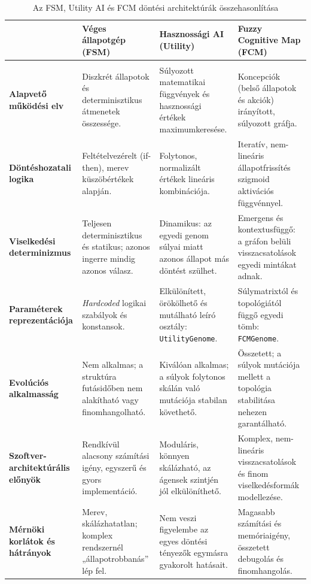 \small
\begin{longtable}{| >{\RaggedRight}p{2.8cm} | >{\RaggedRight}p{3.8cm} | >{\RaggedRight}p{3.8cm} | >{\RaggedRight}p{3.8cm} |}
\caption{Az FSM, Utility AI és FCM döntési architektúrák összehasonlítása}
\label{table:decision_comparison} \\
\hline
\textbf{} & \textbf{Véges állapotgép \newline (FSM)} & \textbf{Hasznossági AI \newline (Utility)} & \textbf{Fuzzy Cognitive Map \newline (FCM)} \\ \hline

\endhead

\hline
\multicolumn{4}{r}{\textit{Folytatás a következő oldalon...}} \\
\endfoot

\hline
\endlastfoot

\textbf{Alapvető működési elv} & Diszkrét állapotok és determinisztikus átmenetek összessége. & Súlyozott matematikai függvények és hasznossági értékek maximumkeresése. & Koncepciók (belső állapotok és akciók) irányított, súlyozott gráfja. \\ \hline

\textbf{Döntéshozatali logika} & Feltételvezérelt (if-then), merev küszöbértékek alapján. & Folytonos, normalizált értékek lineáris kombinációja. & Iteratív, nem-lineáris állapotfrissítés szigmoid aktivációs függvénnyel. \\ \hline

\textbf{Viselkedési determinizmus} & Teljesen determinisztikus és statikus; azonos ingerre mindig azonos válasz. & Dinamikus: az egyedi genom súlyai miatt azonos állapot más döntést szülhet. & Emergens és kontextusfüggő: a gráfon belüli visszacsatolások egyedi mintákat adnak. \\ \hline

\textbf{Paraméterek reprezentációja} & \textit{Hardcoded} logikai szabályok és konstansok. & Elkülönített, örökölhető és mutálható leíró osztály: \texttt{UtilityGenome}. & Súlymatrixtól és topológiától függő egyedi tömb: \texttt{FCMGenome}. \\ \hline

\textbf{Evolúciós alkalmasság} & Nem alkalmas; a struktúra futásidőben nem alakítható vagy finomhangolható. & Kiválóan alkalmas; a súlyok folytonos skálán való mutációja stabilan követhető. & Összetett; a súlyok mutációja mellett a topológia stabilitása nehezen garantálható. \\ \hline

\textbf{Szoftver-architektúrális előnyök} & Rendkívül alacsony számítási igény, egyszerű és gyors implementáció. & Moduláris, könnyen skálázható, az ágensek szintjén jól elkülöníthető. & Komplex, nem-lineáris visszacsatolások és finom viselkedésformák modellezése. \\ \hline

\textbf{Mérnöki korlátok és hátrányok} & Merev, skálázhatatlan; komplex rendszernél „állapotrobbanás” lép fel. & Nem veszi figyelembe az egyes döntési tényezők egymásra gyakorolt hatásait. & Magasabb számítási és memóriaigény, összetett debugolás és finomhangolás. \\ \hline
\end{longtable}
